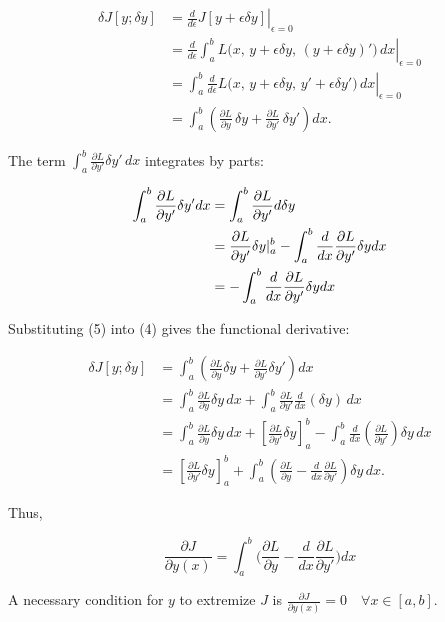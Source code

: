 \begin{align}
\delta J[y;\delta y]
&=\left.\frac{d}{d\epsilon}J[y+\epsilon\delta y]\right|_{\epsilon=0} \\
&=\left.\frac{d}{d\epsilon}\int_a^b
L\big(x,\,y+\epsilon\delta y,\,(y+\epsilon\delta y)'\big)\,dx\right|_{\epsilon=0} \\
&=\left.\int_a^b
\frac{d}{d\epsilon}
L\big(x,\,y+\epsilon\delta y,\,y'+\epsilon\delta y'\big)\,dx\right|_{\epsilon=0} \\
&=\int_a^b
\left(
\frac{\partial L}{\partial y}\,\delta y
+
\frac{\partial L}{\partial y'}\,\delta y'
\right)dx.
\end{align} 

The term \(\int_a^b \frac{\partial L}{\partial y'}\delta y'\,dx\) integrates by parts:

\begin{align}
\int_a^b \frac{\partial L}{\partial y'}\delta y'dx &=\int_a^b \frac{\partial L}{\partial y'}d\delta y  \\
&=\frac{\partial L}{\partial y'}\delta y \large|_a^b - \int_a^b \frac{d }{dx} \frac{\partial L}{\partial y'} \delta ydx \\
&= -\int_a^b \frac{d }{dx} \frac{\partial L}{\partial y'} \delta y dx 
\end{align} 

Substituting (5) into (4) gives the functional derivative:

\[
\begin{aligned}
\delta J[y;\delta y]
&= \int_a^b \left(\frac{\partial L}{\partial y}\delta y+\frac{\partial L}{\partial y'}\delta y'\right)dx \\
&= \int_a^b \frac{\partial L}{\partial y}\delta y\,dx
+ \int_a^b \frac{\partial L}{\partial y'}\frac{d}{dx}(\delta y)\,dx \\
&= \int_a^b \frac{\partial L}{\partial y}\delta y\,dx
+ \left[\frac{\partial L}{\partial y'}\delta y\right]_a^b
- \int_a^b \frac{d}{dx}\left(\frac{\partial L}{\partial y'}\right)\delta y\,dx \\
&= \left[\frac{\partial L}{\partial y'}\delta y\right]_a^b
+ \int_a^b \left(\frac{\partial L}{\partial y}-\frac{d}{dx}\frac{\partial L}{\partial y'}\right)\delta y\,dx.
\end{aligned}
\]

Thus,

\[
\frac{\partial J}{\partial y(x)} = \int_a^b\big ( \frac{\partial L}{\partial y} - \frac{d }{dx} \frac{\partial L}{\partial y'} \big ) dx
\]

A necessary condition for \(y\) to extremize \(J\) is \(\frac{\partial J}{\partial y(x)}=0\quad \forall x \in [a,b]\).
